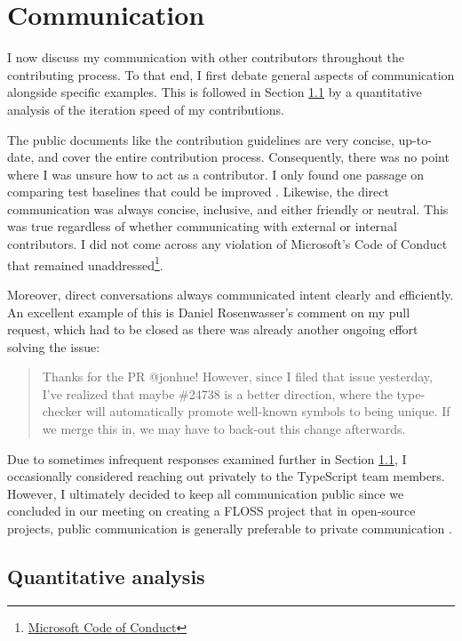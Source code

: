 \documentclass[12pt]{scrartcl}
\begin{document}
\section{Communication}

I now discuss my communication with other contributors throughout the contributing process. To that end, I first debate general aspects of communication alongside specific examples. This is followed in Section \ref{quantitative_analysis} by a quantitative analysis of the iteration speed of my contributions.

The public documents like the contribution guidelines are very concise, up-to-date, and cover the entire contribution process. Consequently, there was no point where I was unsure how to act as a contributor. I only found one passage on comparing test baselines that could be improved \cite{41991}. Likewise, the direct communication was always concise, inclusive, and either friendly or neutral. This was true regardless of whether communicating with external or internal contributors. I did not come across any violation of Microsoft's Code of Conduct that remained unaddressed\footnote{\href{https://opensource.microsoft.com/codeofconduct/}{Microsoft Code of Conduct}}.

Moreover, direct conversations always communicated intent clearly and efficiently. An excellent example of this is Daniel Rosenwasser's comment on my pull request, which had to be closed as there was already another ongoing effort solving the issue:

\begin{quote}
    Thanks for the PR @jonhue! However, since I filed that issue yesterday, I've realized that maybe \#24738 is a better direction, where the type-checker will automatically promote well-known symbols to being unique. If we merge this in, we may have to back-out this change afterwards. \cite{42530Comment}
\end{quote}

Due to sometimes infrequent responses examined further in Section \ref{quantitative_analysis}, I occasionally considered reaching out privately to the TypeScript team members. However, I ultimately decided to keep all communication public since we concluded in our meeting on creating a FLOSS project that in open-source projects, public communication is generally preferable to private communication \cite{Priv1,13995Comment}.

\subsection{Quantitative analysis}
\label{quantitative_analysis}
\end{document}
